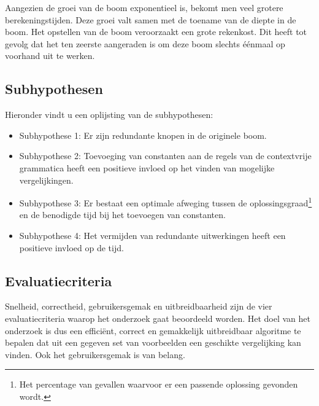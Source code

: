 \documentclass[Main.tex]{subfiles}
\begin{document}
Aangezien de groei van de boom exponentieel is, bekomt men veel grotere berekeningstijden. Deze groei valt samen met de toename van de diepte in de boom. Het opstellen van de boom veroorzaakt een grote rekenkost. Dit heeft tot gevolg dat het ten zeerste aangeraden is om deze boom slechts \'e\'enmaal op voorhand uit te werken.

\subsection{Subhypothesen} \label{ssec:subhypothesen}
\par Hieronder vindt u een oplijsting van de subhypothesen:

\begin{itemize}
\item Subhypothese 1: Er zijn redundante knopen in de originele boom.
\item Subhypothese 2: Toevoeging van constanten aan de regels van de contextvrije grammatica heeft een positieve invloed op het vinden van mogelijke vergelijkingen.
\item Subhypothese 3: Er bestaat een optimale afweging tussen de oplossingsgraad\footnote{\label{note:oplossingsgraad}Het percentage van gevallen waarvoor er een passende oplossing gevonden wordt.} en de benodigde tijd bij het toevoegen van constanten.
\item Subhypothese 4: Het vermijden van redundante uitwerkingen heeft een positieve invloed op de tijd. 
\end{itemize}

\subsection{Evaluatiecriteria}

Snelheid, correctheid, gebruikersgemak en uitbreidbaarheid zijn de vier evaluatiecriteria waarop het onderzoek gaat beoordeeld worden. Het doel van het onderzoek is dus een effici\"ent, correct en gemakkelijk uitbreidbaar algoritme te bepalen dat uit een gegeven set van voorbeelden een geschikte vergelijking kan vinden. Ook het gebruikersgemak is van belang.
\end{document}
